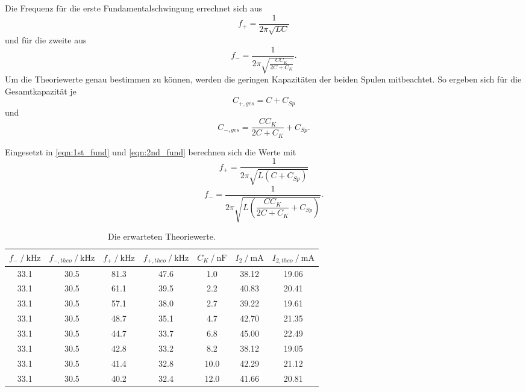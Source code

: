 Die Frequenz für die erste Fundamentalschwingung errechnet sich aus 
\begin{equation}
    \label{eqn:1st_fund}
    f_+ = \frac{1}{2\pi\sqrt{LC}}
\end{equation}
und für die zweite aus
\begin{equation}
    \label{eqn:2nd_fund}
    f_- = \frac{1}{2\pi\sqrt{\frac{CC_K}{2C+C_K}}}.
\end{equation}
Um die Theoriewerte genau bestimmen zu können, werden die geringen Kapazitäten der beiden Spulen mitbeachtet.
So ergeben sich für die Gesamtkapazität je 
\begin{equation}
    C_{+, ges} = C + C_{Sp}
\end{equation}
und
\begin{equation}
    C_{-, ges} = \frac{CC_K}{2C+C_K} + C_{Sp}.
\end{equation}

Eingesetzt in \eqref{eqn:1st_fund} und \eqref{eqn:2nd_fund} berechnen sich die Werte mit
\begin{equation}
    \label{eqn:1st_fund_Csp}
    f_+ = \frac{1}{2\pi\sqrt{L(C + C_{Sp})}}
\end{equation}
\begin{equation}
    \label{eqn:2nd_fund_Csp}
    f_- = \frac{1}{2\pi\sqrt{L(\dfrac{CC_K}{2C+C_K} + C_{Sp})}}.
\end{equation}

\begin{table}
    \centering
    \caption{Die erwarteten Theoriewerte.}
    \label{tab:theorie}
    \begin{tabular}{c c c c c c c}
        \toprule
        $f_- \:/\: \si{\kilo\hertz}$ & $f_{-, theo} \:/\: \si{\kilo\hertz}$ & $f_+ \:/\: \si{\kilo\hertz}$ & $f_{+, theo} \:/\: \si{\kilo\hertz}$ & $C_K \:/\: \si{\nano\farad}$ & $I_2 \:/\: \si{\milli\ampere}$ & $I_{2,theo} \:/\: \si{\milli\ampere}$ \\
        \midrule
        33.1 & 30.5 & 81.3 & 47.6 & 1.0  &  38.12 & 19.06 \\  
        33.1 & 30.5 & 61.1 & 39.5 & 2.2  &  40.83 & 20.41 \\
        33.1 & 30.5 & 57.1 & 38.0 & 2.7  &  39.22 & 19.61 \\
        33.1 & 30.5 & 48.7 & 35.1 & 4.7  &  42.70 & 21.35 \\
        33.1 & 30.5 & 44.7 & 33.7 & 6.8  &  45.00 & 22.49 \\
        33.1 & 30.5 & 42.8 & 33.2 & 8.2  &  38.12 & 19.05 \\
        33.1 & 30.5 & 41.4 & 32.8 & 10.0 &  42.29 & 21.12 \\
        33.1 & 30.5 & 40.2 & 32.4 & 12.0 &  41.66 & 20.81 \\
        \bottomrule
    \end{tabular}
\end{table}